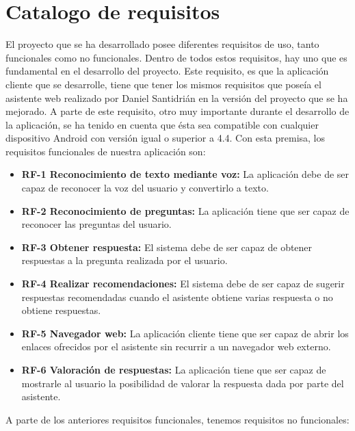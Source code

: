 \section{Catalogo de requisitos}

El proyecto que se ha desarrollado posee diferentes requisitos de uso, tanto funcionales como no funcionales. Dentro de todos estos requisitos, hay uno que es fundamental en el desarrollo del proyecto. Este requisito, es que la aplicación cliente que se desarrolle, tiene que tener los mismos requisitos que poseía el asistente web realizado por Daniel Santidrián en la versión del proyecto que se ha mejorado. \newline A parte de este requisito, otro muy importante durante el desarrollo de la aplicación, se ha tenido en cuenta que ésta sea compatible con cualquier dispositivo Android con versión igual o superior a 4.4. \newline Con esta premisa, los requisitos funcionales de nuestra aplicación son:

\begin{itemize}
	\tightlist
	\item
	\textbf{RF-1 Reconocimiento de texto mediante voz:} La aplicación debe de ser capaz de reconocer la voz del usuario y convertirlo a texto.
	\item 
	\textbf{RF-2 Reconocimiento de preguntas:} La aplicación tiene que ser capaz de reconocer las preguntas del usuario.
	\item 
	\textbf{RF-3 Obtener respuesta:} El sistema debe de ser capaz de obtener respuestas a la pregunta realizada por el usuario.
	\item 
	\textbf{RF-4 Realizar recomendaciones:} El sistema debe de ser capaz de sugerir respuestas recomendadas cuando el asistente obtiene varias respuesta o no obtiene respuestas.
	\item 
	\textbf{RF-5 Navegador web:} La aplicación cliente tiene que ser capaz de abrir los enlaces ofrecidos por el asistente sin recurrir a un navegador web externo.
	\item 
	\textbf{RF-6 Valoración de respuestas:} La aplicación tiene que ser capaz de mostrarle al usuario la posibilidad de valorar la respuesta dada por parte del asistente.
\end{itemize}

A parte de los anteriores requisitos funcionales, tenemos requisitos no funcionales:

